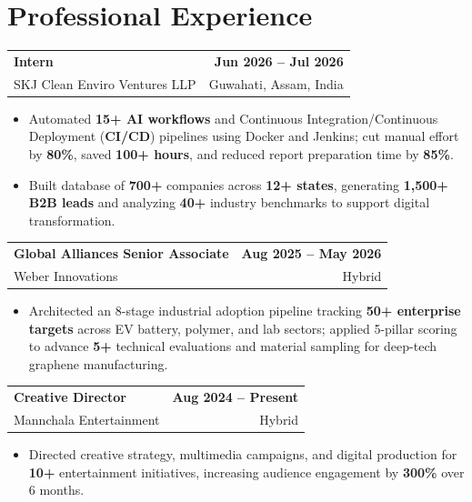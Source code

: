 \documentclass[letterpaper,10pt]{article}
\begin{document}
\vspace{-4pt}
\section{Professional Experience}
\small
\begin{tabularx}{\textwidth}{@{}Xr@{}}
  \textbf{Intern} & \textbf{Jun 2026 -- Jul 2026} \\
  SKJ Clean Enviro Ventures LLP & Guwahati, Assam, India
\end{tabularx}
\begin{itemize}[leftmargin=0.18in,itemsep=1.5pt,topsep=2pt]
  \item Automated \textbf{15+ AI workflows} and Continuous Integration/Continuous Deployment (\textbf{CI/CD}) pipelines using Docker and Jenkins; cut manual effort by \textbf{80\%}, saved \textbf{100+ hours}, and reduced report preparation time by \textbf{85\%}.
  \item Built database of \textbf{700+} companies across \textbf{12+ states}, generating \textbf{1,500+ B2B leads} and analyzing \textbf{40+} industry benchmarks to support digital transformation.
\end{itemize}

\vspace{3pt}
\begin{tabularx}{\textwidth}{@{}Xr@{}}
  \textbf{Global Alliances Senior Associate} & \textbf{Aug 2025 -- May 2026} \\
  Weber Innovations & Hybrid
\end{tabularx}
\begin{itemize}[leftmargin=0.18in,itemsep=1.5pt,topsep=2pt]
  \item Architected an 8-stage industrial adoption pipeline tracking \textbf{50+ enterprise targets} across EV battery, polymer, and lab sectors; applied 5-pillar scoring to advance \textbf{5+} technical evaluations and material sampling for deep-tech graphene manufacturing.
\end{itemize}

\vspace{3pt}
\begin{tabularx}{\textwidth}{@{}Xr@{}}
  \textbf{Creative Director} & \textbf{Aug 2024 -- Present} \\
  Mannchala Entertainment & Hybrid
\end{tabularx}
\begin{itemize}[leftmargin=0.18in,itemsep=1.5pt,topsep=2pt]
  \item Directed creative strategy, multimedia campaigns, and digital production for \textbf{10+} entertainment initiatives, increasing audience engagement by \textbf{300\%} over 6 months.
\end{itemize}
\end{document}
